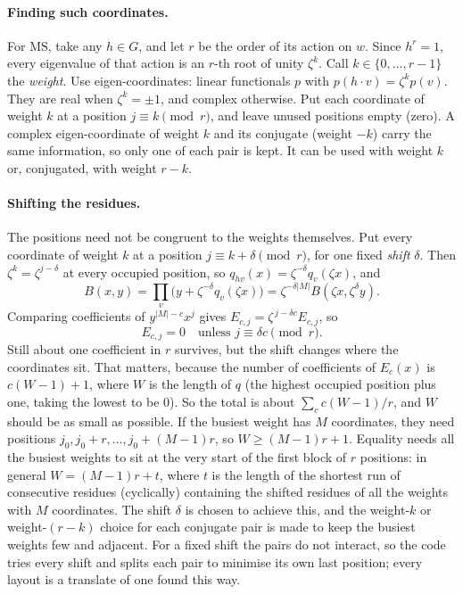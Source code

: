\documentclass[11pt]{article}
\theoremstyle{definition}
\theoremstyle{remark}
\newcommand{\MS}{\mathrm{MS}}
\begin{document}
\paragraph{Finding such coordinates.}
For $\MS$, take any $h \in G$, and let $r$ be the order of its action on $w$.
Since $h^r = 1$, every eigenvalue of that action is an $r$-th root of unity
$\zeta^k$. Call $k \in \{0, \ldots, r-1\}$ the \emph{weight}. Use
eigen-coordinates: linear functionals $p$ with $p(h \cdot v) = \zeta^k p(v)$.
They are real when $\zeta^k = \pm 1$, and complex otherwise. Put each coordinate
of weight $k$ at a position $j \equiv k \pmod r$, and leave unused positions
empty (zero). A complex eigen-coordinate of weight $k$ and its conjugate
(weight $-k$) carry the same information, so only one of each pair is kept. It
can be used with weight $k$ or, conjugated, with weight $r-k$.

\paragraph{Shifting the residues.}
The positions need not be congruent to the weights themselves. Put every
coordinate of weight $k$ at a position $j \equiv k + \delta \pmod r$, for one
fixed \emph{shift} $\delta$. Then $\zeta^k = \zeta^{j-\delta}$ at every occupied
position, so $q_{hv}(x) = \zeta^{-\delta} q_v(\zeta x)$, and
\[
  B(x, y) = \prod_{v} \bigl(y + \zeta^{-\delta} q_v(\zeta x)\bigr)
          = \zeta^{-\delta |M|} B(\zeta x, \zeta^{\delta} y) .
\]
Comparing coefficients of $y^{|M|-c}x^j$ gives
$E_{c,j} = \zeta^{\,j - \delta c} E_{c,j}$, so
\[
  E_{c,j} = 0 \quad \text{unless } j \equiv \delta c \pmod r .
\]
Still about one coefficient in $r$ survives, but the shift changes where the
coordinates sit. That matters, because the number of coefficients of $E_c(x)$
is $c(W-1)+1$, where $W$ is the length of $q$ (the highest occupied position
plus one, taking the lowest to be 0). So the total is about
$\sum_c c(W-1)/r$, and $W$ should be as small as possible. If the busiest
weight has $M$ coordinates, they need positions $j_0, j_0 + r, \ldots,
j_0 + (M-1)r$, so $W \ge (M-1)r + 1$. Equality needs all the busiest weights to
sit at the very start of the first block of $r$ positions: in general
$W = (M-1)r + t$, where $t$ is the length of the shortest run of consecutive
residues (cyclically) containing the shifted residues of all the weights with
$M$ coordinates. The shift $\delta$ is chosen to achieve this, and the
weight-$k$ or weight-$(r-k)$ choice for each conjugate pair is made to keep
the busiest weights few and adjacent. For a fixed shift the pairs do not
interact, so the code tries every shift and splits each pair to minimise its
own last position; every layout is a translate of one found this way.
\end{document}
